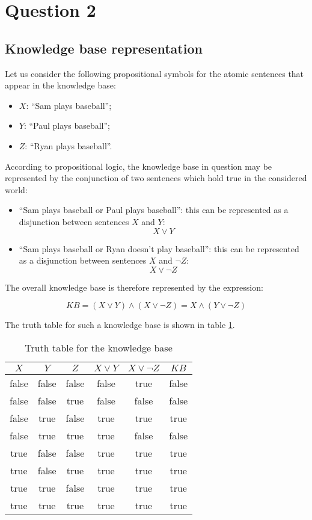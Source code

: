\documentclass[letterpaper,headings=standardclasses]{scrartcl}
\begin{document}
\section{Question 2}

\subsection{Knowledge base representation}

Let us consider the following propositional symbols for the atomic sentences that appear in the knowledge base:

\begin{itemize}
    \item $X$: ``Sam plays baseball'';
    \item $Y$: ``Paul plays baseball'';
    \item $Z$: ``Ryan plays baseball''.
\end{itemize}

According to propositional logic, the knowledge base in question may be represented by the conjunction of two sentences which hold true in the considered world:

\begin{itemize}
    \item ``Sam plays baseball or Paul plays baseball'': this can be represented as a disjunction between sentences $X$ and $Y$:
    $$ X \vee Y $$
    \item ``Sam plays baseball or Ryan doesn't play baseball'': this can be represented as a disjunction between sentences $X$ and $\neg Z$:
    $$ X \vee \neg Z $$
\end{itemize}

The overall knowledge base is therefore represented by the expression:

$$ KB = (X \vee Y) \wedge (X \vee \neg Z) = X \wedge (Y \vee \neg Z) $$

The truth table for such a knowledge base is shown in table \ref{tt_kb}.

\begin{table}[h]
    \centering
    \begin{tabular}{|c|c|c|c|c|c|}
    \hline
    $X$ & $Y$ & $Z$ & $X \vee Y$ & $X \vee \neg Z$ & $KB$ \\ \hline
    false & false & false & false & true & false \\ \hline
    false & false & true & false & false & false \\ \hline
    false & true & false & true & true & true \\ \hline
    false & true & true & true & false & false \\ \hline
    true & false & false & true & true & true \\ \hline
    true & false & true & true & true & true \\ \hline
    true & true & false & true & true & true \\ \hline
    true & true & true & true & true & true \\ \hline
    \end{tabular}
    \caption{Truth table for the knowledge base}
    \label{tt_kb}
\end{table}
\end{document}
